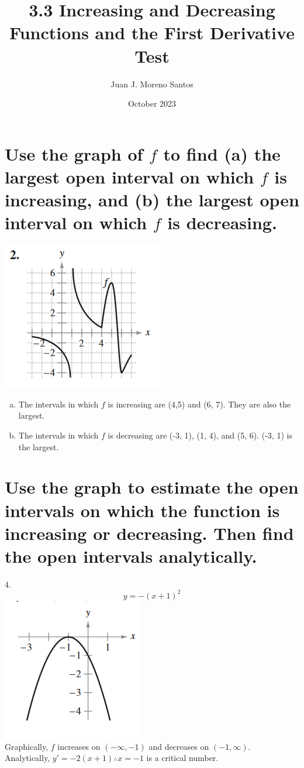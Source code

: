 \documentclass[11pt]{article}
\title{3.3 Increasing and Decreasing Functions and the First Derivative Test}
\author{Juan J. Moreno Santos}
\date{October 2023}
\begin{document}
\maketitle

\section{Use the graph of $f$ to find (a) the largest open interval on which $f$ is increasing, and (b) the largest open interval on which $f$ is decreasing.}
\includegraphics{2.png}
\begin{enumerate}[(a)]
    \item The intervals in which $f$ is increasing are (4,5) and (6, 7). They are also the largest.
    \item The intervals in which $f$ is decreasing are (-3, 1), (1, 4), and (5, 6). (-3, 1) is the largest.
\end{enumerate}

\section{Use the graph to estimate the open intervals on which the function is increasing or decreasing. Then find the open intervals analytically.}
4.\[y=-(x+1)^2\]
\includegraphics{4.png}\\
Graphically, $f$ increases on 
$(-\infty, -1)$ and decreases on $(-1, \infty)$.\\
Analytically, $y'=-2(x+1)\therefore x=-1$ is a critical number.\\
\end{document}
